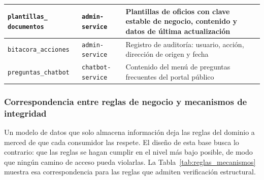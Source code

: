 \begin{longtable}{|p{3.5cm}|p{3.1cm}|p{7.5cm}|}
		\texttt{plantillas\_} \texttt{documentos} & \texttt{admin-service} & Plantillas de oficios
		con clave estable de negocio, contenido y datos de última actualización \\ \hline
	
		\texttt{bitacora\_acciones} & \texttt{admin-service} & Registro de auditoría: usuario, acción,
		dirección de origen y fecha \\ \hline
	
		\texttt{preguntas\_chatbot} & \texttt{chatbot-\allowbreak service} & Contenido del menú de preguntas
		frecuentes del portal público \\ \hline
	\end{longtable}
	
	\normalsize
	
	\subsubsection{Correspondencia entre reglas de negocio y mecanismos de integridad}
	Un modelo de datos que solo almacena información deja las reglas del dominio a merced de que
	cada consumidor las respete. El diseño de esta base busca lo contrario: que las reglas se hagan
	cumplir en el nivel más bajo posible, de modo que ningún camino de acceso pueda violarlas. La
	Tabla~\ref{tab:reglas_mecanismos} muestra esa correspondencia para las reglas que admiten
	verificación estructural.
	
	\small
	\renewcommand{\arraystretch}{1.2}
	
